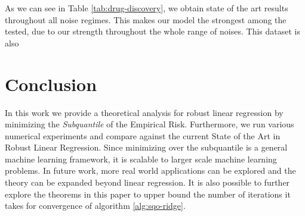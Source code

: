 \documentclass{article} %
\begin{document}
	As we can see in Table \ref{tab:drug-discovery}, we obtain state of the art results throughout all noise regimes. This makes our model the strongest among the tested, due to our strength throughout the whole range of noises. This dataset is also 
	
	\section{Conclusion}
	In this work we provide a theoretical analysis for robust linear regression by minimizing the \textit{Subquantile} of the Empirical Risk. Furthermore, we run various numerical experiments and compare against the current State of the Art in Robust Linear Regression. Since minimizing over the subquantile is a general machine learning framework, it is scalable to larger scale machine learning problems. In future work, more real world applications can be explored and the theory can be expanded beyond linear regression. It is also possible to further explore the theorems in this paper to upper bound the number of iterations it takes for convergence of algorithm \ref{alg:sqo-ridge}.
	
	\newpage

	
	
	
\end{document}
